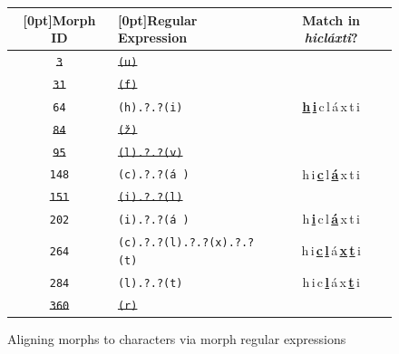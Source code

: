 {\begin{figure}[t]
\centering
\setlength{\extrarowheight}{6pt}
 \begin{tabular}{clc}
\toprule
\raisebox{0pt}[0pt]{Morph ID} & \raisebox{0pt}[0pt]{Regular Expression} & Match in \textit{hicl\'{a}xti}? \\
 \midrule
                \sout{\texttt{3}} & \sout{\texttt{(u)}} & \\
                \sout{\texttt{31}} &  \sout{\texttt{(f)}} &  \\
                \texttt{64} &  \texttt{(h).?.?(i)} & \textbf{\underline{h}\,\underline{i}\,}c\,l\,\'{a}\,x\,t\,i  \\
               \sout{\texttt{84}} &  \sout{\texttt{(\v{z})}} &  \\
                \sout{\texttt{95}} &  \sout{\texttt{(l).?.?(v)}} & \\ 
                \texttt{148} &   \texttt{(c).?.?(\'{a}\,)} & h\,i\,\textbf{\underline{c}}\,l\,\textbf{\underline{\'{a}}}\,x\,t\,i \\
                \sout{\texttt{151}}  &  \sout{\texttt{(i).?.?(l)}} &  \\
                \texttt{202} &  \texttt{(i).?.?(\'{a}\,)} & h\,\textbf{\underline{i}}\,c\,l\,\textbf{\underline{\'{a}}}\,x\,t\,i \\
                \texttt{264} &  \texttt{(c).?.?(l).?.?(x).?.?(t)}  & h\,i\,\textbf{\underline{c}}\,\textbf{\underline{l}}\,\'{a}\,\textbf{\underline{x}}\,\textbf{\underline{t}}\,i \\
                \texttt{284} &  \texttt{(l).?.?(t)} & h\,i\,c\,\textbf{\underline{l}}\,\'{a}\,x\,\textbf{\underline{t}}\,i  \\
                \sout{\texttt{360}} &  \sout{\texttt{(r)}} & \\
       \bottomrule
 \end{tabular}
 \label{fig:morph-regex}
 \caption{Aligning morphs to characters via morph regular expressions}
\end{figure}

}
